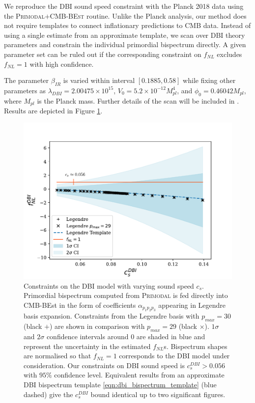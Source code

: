 We reproduce the DBI sound speed constraint with the Planck 2018 data using the \textsc{Primodal}$+$\textsc{CMB-BEst} routine. Unlike the Planck analysis, our method does not require templates to connect inflationary predictions to CMB data. Instead of using a single estimate from an approximate template, we scan over DBI theory parameters and constrain the individual primordial bispectrum directly. A given parameter set can be ruled out if the corresponding constraint on $f_{NL}$ excludes $f_{NL}=1$ with high confidence.

The parameter $\beta_{IR}$ is varied within interval $[0.1885,0.58]$ while fixing other parameters as $\lambda_{DBI} = 2.00475 \times 10^15$, $V_0 = 5.2 \times 10^{-12} M^4_{pl}$, and $\phi_0 = 0.46042 M_{pl}$, where $M_{pl}$ is the Planck mass. Further details of the scan will be included in \cite{Sohn2021inprep}. Results are depicted in Figure \ref{fig:dbi_sound_speed_scan}.

\begin{figure}[htbp!] 
	\centering    
	\includegraphics[width=\textwidth]{dbi_sound_speed_scan_annotated_new.pdf}
	\caption{Constraints on the DBI model with varying sound speed $c_s$. Primordial bispectrum computed from \textsc{Primodal} is fed directly into CMB-BEst in the form of coefficients $\alpha_{p_1 p_2 p_3}$ appearing in Legendre basis expansion. Constraints from the Legendre basis with $p_{max}=30$ (black $+$) are shown in comparison with $p_{max}=29$ (black $\times$). $1\sigma$ and $2\sigma$ confidence intervals around $0$ are shaded in blue and represent the uncertainty in the estimated $f_{NL}$s. Bispectrum shapes are normalised so that $f_{NL}=1$ corresponds to the DBI model under consideration. Our constraints on DBI sound speed is $c^{DBI}_s > 0.056$ with $95\%$ confidence level. Equivalent results from an approximate DBI bispectrum template \eqref{eqn:dbi_bispectrum_template} (blue dashed) give the $c^{DBI}_s$ bound identical up to two significant figures.}
	\label{fig:dbi_sound_speed_scan}
\end{figure}

